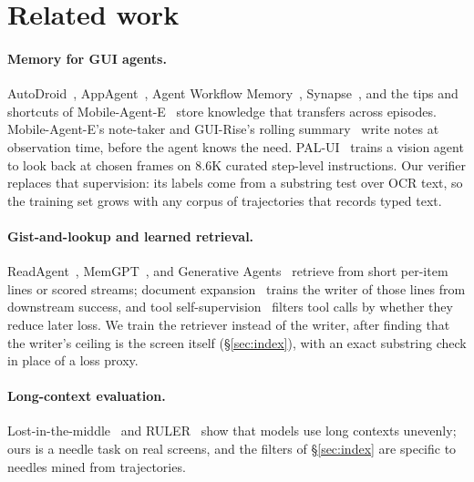 \section{Related work}
\paragraph{Memory for GUI agents.} AutoDroid~\citep{autodroid}, AppAgent~\citep{appagent}, Agent Workflow Memory~\citep{awm}, Synapse~\citep{synapse}, and the tips and shortcuts of Mobile-Agent-E~\citep{mobileagente} store knowledge that transfers across episodes. Mobile-Agent-E's note-taker and GUI-Rise's rolling summary~\citep{guirise} write notes at observation time, before the agent knows the need. PAL-UI~\citep{palui} trains a vision agent to look back at chosen frames on 8.6K curated step-level instructions. Our verifier replaces that supervision: its labels come from a substring test over OCR text, so the training set grows with any corpus of trajectories that records typed text.

\paragraph{Gist-and-lookup and learned retrieval.} ReadAgent~\citep{readagent}, MemGPT~\citep{memgpt}, and Generative Agents~\citep{generativeagents} retrieve from short per-item lines or scored streams; document expansion~\citep{doc2query} trains the writer of those lines from downstream success, and tool self-supervision~\citep{toolformer} filters tool calls by whether they reduce later loss. We train the retriever instead of the writer, after finding that the writer's ceiling is the screen itself (\S\ref{sec:index}), with an exact substring check in place of a loss proxy.

\paragraph{Long-context evaluation.} Lost-in-the-middle~\citep{lostmiddle} and RULER~\citep{ruler} show that models use long contexts unevenly; ours is a needle task on real screens, and the filters of \S\ref{sec:index} are specific to needles mined from trajectories.
